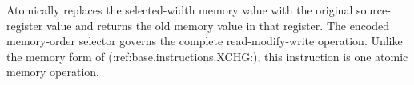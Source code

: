 Atomically replaces the selected-width memory value with the original source-register value and returns the old
memory value in that register. The encoded memory-order selector governs the complete read-modify-write operation.
Unlike the memory form of (:ref:base.instructions.XCHG:), this instruction is one atomic memory operation.
